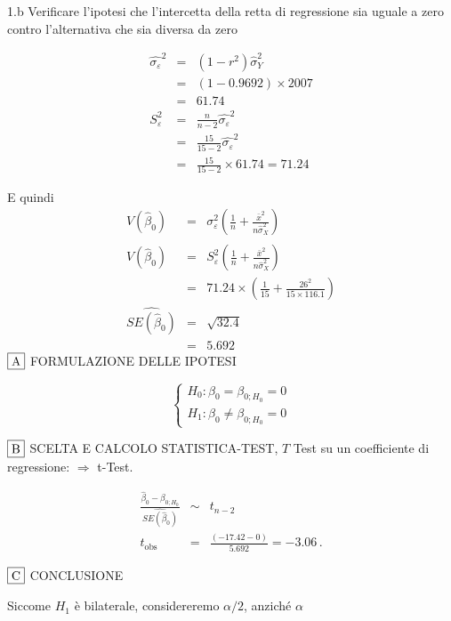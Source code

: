 \documentclass[
  11pt,
]{book}
\theoremstyle{mytheoremstyle}
\theoremstyle{mydefstyle}
\newenvironment{sol}
  {
  \begin{tcolorbox}[enhanced,breakable,arc=0.1mm,boxrule=1pt,colback=white,colframe=iblue,
  title=\bf \fontfamily{lmss}\selectfont \hspace{.5 cm} Soluzione,drop fuzzy shadow]

}{
\end{tcolorbox}
  }
\begin{document}
1.b
Verificare l'ipotesi che l'intercetta della retta di
regressione sia uguale a zero contro l'alternativa che sia
diversa da zero

\begin{sol}
\begin{eqnarray*}
\hat{\sigma_\varepsilon}^2&=&(1-r^2)\hat\sigma_Y^2\\
&=& (1- 0.9692 )\times 2007 \\
   &=&  61.74 \\
   S_\varepsilon^2 &=& \frac{n} {n-2} \hat{\sigma_\varepsilon}^2\\
   &=&  \frac{ 15 } { 15 -2} \hat{\sigma_\varepsilon}^2 \\
 &=&  \frac{ 15 } { 15 -2} \times  61.74  =  71.24  
\end{eqnarray*}

E quindi\begin{eqnarray*}
V(\hat\beta_{0}) &=& \sigma_{\varepsilon}^{2} \left( \frac{1} {n}  +  \frac{\bar{x}^{2}} {n \hat{\sigma}^{2}_{X}} \right)\\
\widehat{V(\hat\beta_{0})} &=& S_{\varepsilon}^{2}\left( \frac{1} {n}  +  \frac{\bar{x}^{2}} {n \hat{\sigma}^{2}_{X}} \right)\ \\
 &=&  71.24 \times\left( \frac{1} { 15 }  +  \frac{ 26 ^{2}} { 15 \times  116.1 } \right)\\
 \widehat{SE(\hat\beta_{0})}        &=&  \sqrt{ 32.4 }\\
 &=&  5.692 
\end{eqnarray*}
\(\fbox{A}\) FORMULAZIONE DELLE IPOTESI

\[\begin{cases}
   H_0: \beta_0 = \beta_{0;H_0}=0 \\
   H_1: \beta_0 \neq \beta_{0;H_0}=0 
   \end{cases}\]

\(\fbox{B}\) SCELTA E CALCOLO STATISTICA-TEST, \(T\)
Test su un coefficiente di regressione: \(\Rightarrow\) t-Test.

\begin{eqnarray*}
 \frac{\hat\beta_{ 0 } - \beta_{ 0 ;H_0}} {\widehat{SE(\hat\beta_{ 0 })}}&\sim&t_{n-2}\\
   t_{\text{obs}}
&=& \frac{ ( -17.42 -  0 )} { 5.692 }
 =   -3.06 \, .
\end{eqnarray*}

\(\fbox{C}\) CONCLUSIONE

Siccome \(H_1\) è bilaterale, considereremo \(\alpha/2\),
anziché \(\alpha\)


\end{sol}
\end{document}
